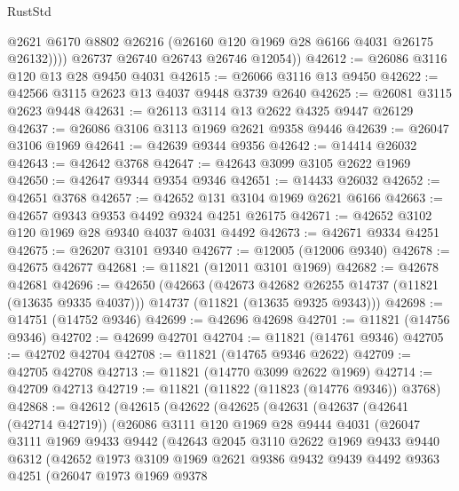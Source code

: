 \begin{lexlean}{RustStd}
\begin{coremodule}
              @2621
              @6170
              @8802
              @26216
              (@26160 @120 @1969 @28 @6166 @4031 @26175 @26132))))
        @26737
        @26740
        @26743
        @26746
        @12054))
@42612 := @26086 @3116 @120 @13 @28 @9450 @4031
@42615 := @26066 @3116 @13 @9450
@42622 := @42566 @3115 @2623 @13 @4037 @9448 @3739 @2640
@42625 := @26081 @3115 @2623 @9448
@42631 := @26113 @3114 @13 @2622 @4325 @9447 @26129
@42637 := @26086 @3106 @3113 @1969 @2621 @9358 @9446
@42639 := @26047 @3106 @1969
@42641 := @42639 @9344 @9356
@42642 := @14414 @26032
@42643 := @42642 @3768
@42647 := @42643 @3099 @3105 @2622 @1969
@42650 := @42647 @9344 @9354 @9346
@42651 := @14433 @26032
@42652 := @42651 @3768
@42657 := @42652 @131 @3104 @1969 @2621 @6166
@42663 := @42657 @9343 @9353 @4492 @9324 @4251 @26175
@42671 := @42652 @3102 @120 @1969 @28 @9340 @4037 @4031 @4492
@42673 := @42671 @9334 @4251
@42675 := @26207 @3101 @9340
@42677 := @12005 (@12006 @9340)
@42678 := @42675 @42677
@42681 := @11821 (@12011 @3101 @1969)
@42682 := @42678 @42681
@42696 := @42650
    (@42663
      (@42673 @42682 @26255 @14737 (@11821 (@13635 @9335 @4037)))
      @14737
      (@11821 (@13635 @9325 @9343)))
@42698 := @14751 (@14752 @9346)
@42699 := @42696 @42698
@42701 := @11821 (@14756 @9346)
@42702 := @42699 @42701
@42704 := @11821 (@14761 @9346)
@42705 := @42702 @42704
@42708 := @11821 (@14765 @9346 @2622)
@42709 := @42705 @42708
@42713 := @11821 (@14770 @3099 @2622 @1969)
@42714 := @42709 @42713
@42719 := @11821 (@11822 (@11823 (@14776 @9346)) @3768)
@42868 := @42612
    (@42615
      (@42622
        (@42625
          (@42631
            (@42637
              (@42641 (@42714 @42719))
              (@26086
                @3111
                @120
                @1969
                @28
                @9444
                @4031
                (@26047
                  @3111
                  @1969
                  @9433
                  @9442
                  (@42643
                    @2045
                    @3110
                    @2622
                    @1969
                    @9433
                    @9440
                    @6312
                    (@42652
                      @1973
                      @3109
                      @1969
                      @2621
                      @9386
                      @9432
                      @9439
                      @4492
                      @9363
                      @4251
                      (@26047
                        @1973
                        @1969
                        @9378

\end{coremodule}
\end{lexlean}

